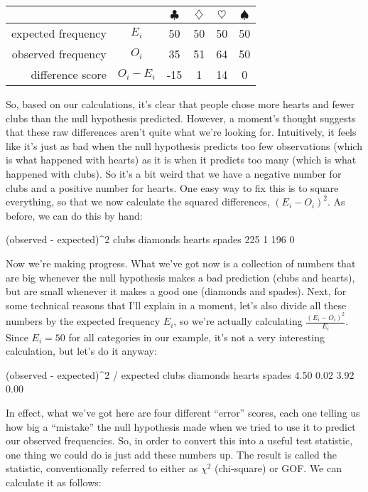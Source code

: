 \begin{center}
\begin{tabular}{rc|cccc}
& & $\clubsuit$ & $\diamondsuit$ & $\heartsuit$ & $\spadesuit$ \\ \hline 
expected frequency &$E_i$ & 50 & 50 & 50 & 50 \\ 
observed frequency &$O_i$ & 35 & 51 & 64 & 50 \\ 
difference score & $O_i - E_i$ & -15 & 1 & 14 & 0 \\
\end{tabular}
\end{center}

So, based on our calculations, it's clear that people chose more hearts and fewer clubs than the null hypothesis predicted. However, a moment's thought suggests that these raw differences aren't quite what we're looking for. Intuitively, it feels like it's just as bad when the null hypothesis predicts too few observations (which is what happened with hearts) as it is when it predicts too many (which is what happened with clubs). So it's a bit weird that we have a negative number for clubs and a positive number for hearts. One easy way to fix this is to square everything, so that we now calculate the squared differences, $(E_i - O_i)^2$. As before, we can do this by hand: 

\begin{rblock1}
(observed - expected)^2
   clubs diamonds   hearts   spades 
     225        1      196        0 
\end{rblock1}

Now we're making progress. What we've got now is a collection of numbers that are big whenever the null hypothesis makes a bad prediction (clubs and hearts), but are small whenever it makes a good one (diamonds and spades). Next, for some technical reasons that I'll explain in a moment, let's also divide all these numbers by the expected frequency $E_i$, so we're actually calculating $\frac{(E_i-O_i)^2}{E_i}$. Since $E_i = 50$ for all categories in our example, it's not a very interesting calculation, but let's do it anyway: 
\begin{rblock1}
(observed - expected)^2 / expected
   clubs diamonds   hearts   spades 
    4.50     0.02     3.92     0.00 
\end{rblock1}

In effect, what we've got here are four different ``error'' scores, each one telling us how big a ``mistake'' the null hypothesis made when we tried to use it to predict our observed frequencies. So, in order to convert this into a useful test statistic, one thing we could do is just add these numbers up. The result is called the  statistic, conventionally referred to either as $\chi^2$ (chi-square) or GOF. We can calculate it as follows: 

